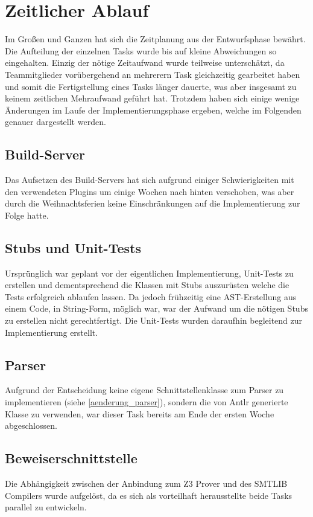 \section{Zeitlicher Ablauf}

Im Großen und Ganzen hat sich die Zeitplanung aus der Entwurfsphase bewährt. Die Aufteilung der einzelnen Tasks wurde bis auf kleine Abweichungen so eingehalten. Einzig der nötige Zeitaufwand wurde teilweise unterschätzt, da Teammitglieder vorübergehend an mehrerern Task gleichzeitig gearbeitet haben und somit die Fertigstellung eines Tasks länger dauerte, was aber insgesamt zu keinem zeitlichen Mehraufwand geführt hat. Trotzdem haben sich einige wenige Änderungen im Laufe der Implementierungsphase ergeben, welche im Folgenden genauer dargestellt werden.

\subsection{Build-Server}
Das Aufsetzen des Build-Servers hat sich aufgrund einiger Schwierigkeiten mit den verwendeten Plugins um einige Wochen nach hinten verschoben, was aber durch die Weihnachtsferien keine Einschränkungen auf die Implementierung zur Folge hatte. 

\subsection{Stubs und Unit-Tests}
Ursprünglich war geplant vor der eigentlichen Implementierung, Unit-Tests zu erstellen und dementsprechend die Klassen mit Stubs auszurüsten welche die Tests erfolgreich ablaufen lassen. Da jedoch frühzeitig eine AST-Erstellung aus einem Code, in String-Form, möglich war, war der Aufwand um die nötigen Stubs zu erstellen nicht gerechtfertigt. Die Unit-Tests wurden daraufhin begleitend zur Implementierung erstellt.

\subsection{Parser}
Aufgrund der Entscheidung keine eigene Schnittstellenklasse zum Parser zu implementieren (siehe \ref{aenderung_parser}), sondern die von Antlr generierte Klasse zu verwenden, war dieser Task bereits am Ende der ersten Woche abgeschlossen.

\subsection{Beweiserschnittstelle}
Die Abhängigkeit zwischen der Anbindung zum Z3 Prover und des SMTLIB Compilers wurde aufgelöst, da es sich als vorteilhaft herausstellte beide Tasks parallel zu entwickeln.

